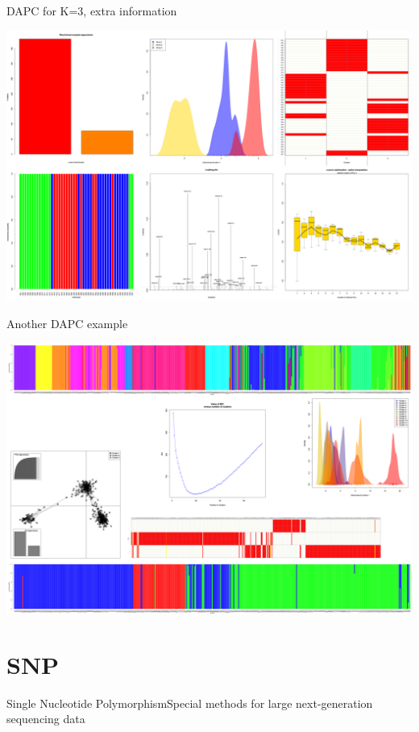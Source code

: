 \documentclass[compress, ucs, xelatex, 11pt, xcolor=svgnames,
	hyperref={
		bookmarks=true,
		unicode=true,
		colorlinks=true,
		pdftitle={Molecular data in R},
		plainpages=false,
		pdfauthor={Vojtech Zeisek},
		pdfsubject={Course about phylogeny and evolution in R},
		pdfcreator={XeLaTeX},
		pdfkeywords={R, evolution, phylogeny, molecular data},
		linkcolor=Tomato,
		anchorcolor=SaddleBrown,
		citecolor=Goldenrod,
		filecolor=DarkMagenta,
		menucolor=Sienna,
		urlcolor=DarkTurquoise,
		pdftex},
	url={hyphens, lowtilde} %
	]{beamer}
\begin{document}
\begin{frame}{DAPC for K=3, extra information}
	\begin{center}
		\includegraphics[width=\textwidth-1.5cm]{dapc3-extra.png}
	\end{center}
\end{frame}

\begin{frame}{Another DAPC example}
	\begin{center}
		\includegraphics[width=\textwidth-1.5cm]{dapc.png}
	\end{center}
\end{frame}

\section{SNP}

\begin{frame}{Single Nucleotide Polymorphism}{Special methods for large next-generation sequencing data}
	\tableofcontents[currentsection, sectionstyle=show/hide, hideothersubsections]
\end{frame}
\end{document}

